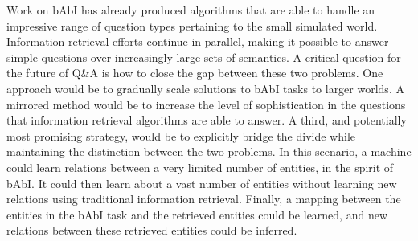 Work on bAbI has already produced algorithms that are able to handle an impressive range of question types pertaining to the small simulated world. Information retrieval efforts continue in parallel, making it possible to answer simple questions over increasingly large sets of semantics. A critical question for the future of Q\&A is how to close the gap between these two problems. One approach would be to gradually scale solutions to bAbI tasks to larger worlds. A mirrored method would be to increase the level of sophistication in the questions that information retrieval algorithms are able to answer. A third, and potentially most promising strategy, would be to explicitly bridge the divide while maintaining the distinction between the two problems. In this scenario, a machine could learn relations between a very limited number of entities, in the spirit of bAbI. It could then learn about a vast number of entities without learning new relations using traditional information retrieval. Finally, a mapping between the entities in the bAbI task and the retrieved entities could be learned, and new relations between these retrieved entities could be inferred. 
%
%
%
